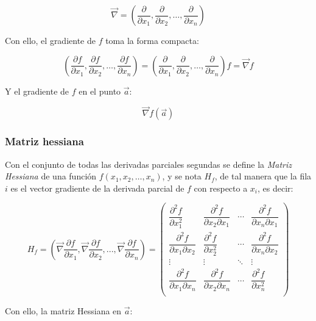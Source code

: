 \[
\vec {\nabla} =\left(\frac{\partial}{\partial x_1},\frac{\partial
}{\partial x_2},\ldots,\frac{\partial }{\partial x_n}\right)
\]

Con ello, el gradiente de $f$ toma la forma compacta:

\[
\left(\frac{\partial f}{\partial x_1},\frac{\partial f}{\partial
x_2},\ldots,\frac{\partial f}{\partial
x_n}\right)=\left(\frac{\partial}{\partial x_1},\frac{\partial
}{\partial x_2},\ldots,\frac{\partial }{\partial
x_n}\right)f=\vec{\nabla}f
\]


Y el gradiente de $f$ en el punto $\vec a$:

\[
\vec {\nabla} f(\vec a)
\]



\subsubsection*{Matriz hessiana}

Con el conjunto de todas las derivadas parciales segundas se define
la \emph{Matriz Hessiana} de una función $f(x_1,x_2,\ldots,x_n)$, y
se nota $H_f$, de tal manera que la fila $i$ es el vector gradiente
de la derivada parcial de $f$ con respecto a $x_i$, es decir:

\[
\renewcommand{\arraystretch}{2.2}
H_f=\left( {\vec \nabla \frac{{\partial f}} {{\partial x_1 }},\vec
\nabla \frac{{\partial f}} {{\partial x_2 }},...,\vec \nabla
\frac{{\partial f}} {{\partial x_n }}} \right)=\left(
\begin{array}{cccc}
 \dfrac{\partial^2 f}{\partial x_1^2}  & \dfrac{\partial^2 f}{\partial x_2\partial x_1}& \cdots & \dfrac{\partial^2 f}{\partial x_n\partial x_1}\\
 \dfrac{\partial^2 f}{\partial x_1\partial x_2} & \dfrac{\partial^2 f}{\partial x_2^2}  & \cdots & \dfrac{\partial^2 f}{\partial x_n\partial x_2} \\
                 \vdots                  &                 \vdots                  & \ddots &                 \vdots                  \\
 \dfrac{\partial^2 f}{\partial x_1\partial x_n} & \dfrac{\partial^2 f}{\partial x_2\partial x_n} & \cdots & \dfrac{\partial^2 f}{\partial x_n^2}  \\
\end{array}
\right)
\]

Con ello, la matriz Hessiana en $\vec a$:

